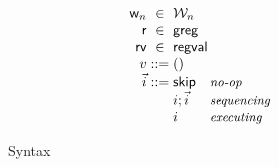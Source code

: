 \begin{wrapfigure}{l}{0.1\textwidth}
  \centering
\newcommand{\commentary}[1]{ & \text{\small\it #1} \\}
\[
  \begin{array}{r@{\;}c@{\;}l}
    \loc & \in & \Loc \\
    \reg & \in & \regset \\
    \regval & \in & \regvaltype \\
    \val & ::= & \vunit

\\
    \instrs & ::= &
    \begin{array}[t]{@{}l@{\hspace{10mm}}l@{}}
    \begin{array}[t]{@{}ll@{}}
      \iskip
                   \commentary{no-op}
      \iseq\instr\instrs
                   \commentary{sequencing}
      \instr
                   \commentary{executing}             
    \end{array}
    \end{array}
    \\
  \end{array}
\]
\caption{Syntax}
\label{fig:syntax}
\end{wrapfigure}

